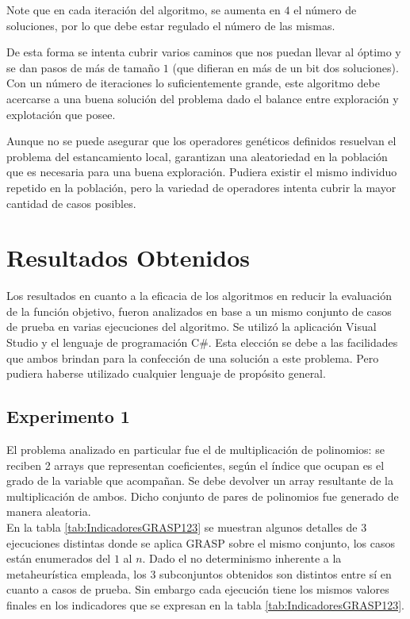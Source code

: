 \documentclass[a4paper,openright,11pt,oneside]{book}
\begin{document}
		Note que en cada iteración del algoritmo, se aumenta en $4$ el número de soluciones, por lo que debe estar regulado el número de las mismas.
	
		De esta forma se intenta cubrir varios caminos que nos puedan llevar al óptimo y se dan pasos de más de tamaño $1$ (que difieran en más de un bit dos soluciones). Con un número de iteraciones lo suficientemente grande, este algoritmo debe acercarse a una buena solución del problema dado el balance entre exploración y explotación que posee.
		
		Aunque no se puede asegurar que los operadores genéticos definidos resuelvan el problema del estancamiento local, garantizan una aleatoriedad en la población que es necesaria para una buena exploración. Pudiera existir el mismo individuo repetido en la población, pero la variedad de operadores intenta cubrir la mayor cantidad de casos posibles.
	
\chapter{Resultados Obtenidos}

	Los resultados en cuanto a la eficacia de los algoritmos en reducir la evaluación de la función objetivo, fueron analizados en base a un mismo conjunto de casos de prueba en varias ejecuciones del algoritmo. Se utilizó la aplicación Visual Studio y el lenguaje de programación C\#. Esta elección se debe a las facilidades que ambos brindan para la confección de una solución a este problema. Pero pudiera haberse utilizado cualquier lenguaje de propósito general. 
	
	\section{Experimento 1}
	El problema analizado en particular fue el de multiplicación de polinomios: se reciben 2 arrays que representan coeficientes, según el índice que ocupan es el grado de la variable que acompañan. Se debe devolver un array resultante de la multiplicación de ambos. Dicho conjunto de pares de polinomios fue generado de manera aleatoria. \\
	
	En la tabla \ref{tab:IndicadoresGRASP123} se muestran algunos detalles de 3 ejecuciones distintas donde se aplica GRASP sobre el mismo conjunto, los casos están enumerados del $1$ al $n$. Dado el no determinismo inherente a la metaheurística empleada, los 3 subconjuntos obtenidos son distintos entre sí en cuanto a casos de prueba. Sin embargo cada ejecución tiene los mismos valores finales en los indicadores que se expresan en la tabla \ref{tab:IndicadoresGRASP123}.
	
\end{document}
